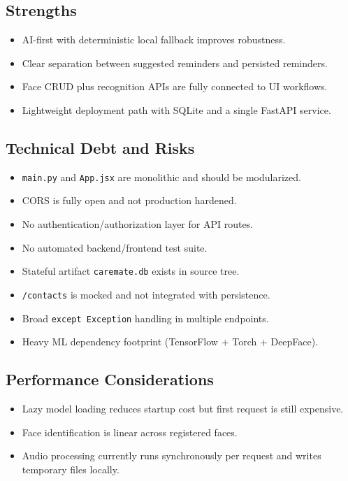 \documentclass[12pt,a4paper]{article}
\begin{document}
\subsection{Strengths}
\begin{itemize}
  \item AI-first with deterministic local fallback improves robustness.
  \item Clear separation between suggested reminders and persisted reminders.
  \item Face CRUD plus recognition APIs are fully connected to UI workflows.
  \item Lightweight deployment path with SQLite and a single FastAPI service.
\end{itemize}

\subsection{Technical Debt and Risks}
\begin{itemize}
  \item \texttt{main.py} and \texttt{App.jsx} are monolithic and should be modularized.
  \item CORS is fully open and not production hardened.
  \item No authentication/authorization layer for API routes.
  \item No automated backend/frontend test suite.
  \item Stateful artifact \texttt{caremate.db} exists in source tree.
  \item \texttt{/contacts} is mocked and not integrated with persistence.
  \item Broad \texttt{except Exception} handling in multiple endpoints.
  \item Heavy ML dependency footprint (TensorFlow + Torch + DeepFace).
\end{itemize}

\subsection{Performance Considerations}
\begin{itemize}
  \item Lazy model loading reduces startup cost but first request is still expensive.
  \item Face identification is linear across registered faces.
  \item Audio processing currently runs synchronously per request and writes temporary files locally.
\end{itemize}
\end{document}
